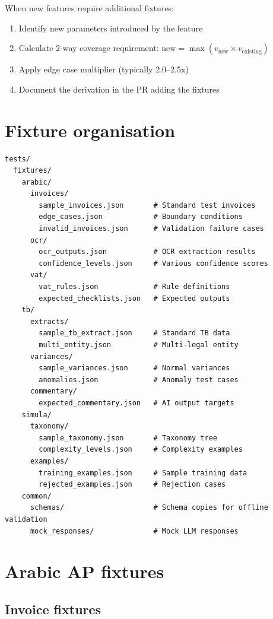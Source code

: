 When new features require additional fixtures:
\begin{enumerate}
  \item Identify new parameters introduced by the feature
  \item Calculate 2-way coverage requirement: $\text{new} = \max(v_{\text{new}} \times v_{\text{existing}})$
  \item Apply edge case multiplier (typically 2.0--2.5x)
  \item Document the derivation in the PR adding the fixtures
\end{enumerate}

\section{Fixture organisation}

\begin{lstlisting}[basicstyle=\ttfamily\small,caption={Test fixture directory structure.}]
tests/
  fixtures/
    arabic/
      invoices/
        sample_invoices.json       # Standard test invoices
        edge_cases.json            # Boundary conditions
        invalid_invoices.json      # Validation failure cases
      ocr/
        ocr_outputs.json           # OCR extraction results
        confidence_levels.json     # Various confidence scores
      vat/
        vat_rules.json             # Rule definitions
        expected_checklists.json   # Expected outputs
    tb/
      extracts/
        sample_tb_extract.json     # Standard TB data
        multi_entity.json          # Multi-legal entity
      variances/
        sample_variances.json      # Normal variances
        anomalies.json             # Anomaly test cases
      commentary/
        expected_commentary.json   # AI output targets
    simula/
      taxonomy/
        sample_taxonomy.json       # Taxonomy tree
        complexity_levels.json     # Complexity examples
      examples/
        training_examples.json     # Sample training data
        rejected_examples.json     # Rejection cases
    common/
      schemas/                     # Schema copies for offline validation
      mock_responses/              # Mock LLM responses
\end{lstlisting}

\section{Arabic AP fixtures}

\subsection{Invoice fixtures}

